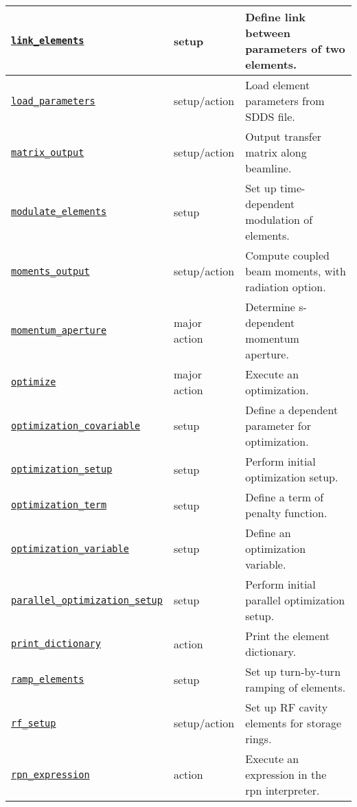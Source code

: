 \documentclass[11pt]{article}
\begin{document}
\begin{longtable}{|p{2.75in}|p{0.75in}|p{2.75in}|}
\hyperref[subsec:linkelements]{\tt link\_elements} & setup & Define link between parameters of two elements. \\ \hline
\hyperref[subsec:loadparameters]{\tt load\_parameters} & setup/action & Load element parameters from SDDS file. \\ \hline
\hyperref[subsec:matrixoutput]{\tt matrix\_output} & setup/action & Output transfer matrix along beamline. \\ \hline
\hyperref[subsec:modulateelements]{\tt modulate\_elements} & setup & Set up time-dependent modulation of elements. \\ \hline

\hyperref[subsec:momentsoutput]{\tt moments\_output} & setup/action & Compute coupled beam moments, with radiation option. \\ \hline
\hyperref[subsec:momentumaperture]{\tt momentum\_aperture} & major action & Determine s-dependent momentum aperture. \\ \hline
\hyperref[subsec:optimize]{\tt optimize} & major action & Execute an optimization. \\ \hline
\hyperref[subsec:optimizationcovariable]{\tt optimization\_covariable} & setup & Define a dependent parameter for optimization. \\ \hline
\hyperref[subsec:optimizationsetup]{\tt optimization\_setup} & setup & Perform initial optimization setup. \\ \hline
\hyperref[subsec:optimizationterm]{\tt optimization\_term} & setup & Define a term of penalty function. \\ \hline
\hyperref[subsec:optimizationvariable]{\tt optimization\_variable} & setup & Define an optimization variable. \\ \hline
\hyperref[subsec:paralleloptimizationsetup]{\tt parallel\_optimization\_setup} & setup & Perform initial parallel optimization setup. \\ \hline
\hyperref[subsec:printdictionary]{\tt print\_dictionary} & action & Print the element dictionary. \\ \hline
\hyperref[subsec:rampelements]{\tt ramp\_elements} & setup & Set up turn-by-turn ramping of elements. \\ \hline
\hyperref[subsec:rfsetup]{\tt rf\_setup} & setup/action & Set up RF cavity elements for storage rings. \\ \hline
\hyperref[subsec:rpnexpression]{\tt rpn\_expression} & action & Execute an expression in the rpn interpreter. \\ \hline

\end{longtable}
\end{document}
